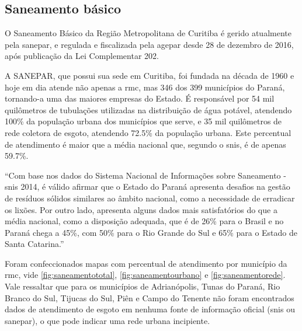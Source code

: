 	\subsection{Saneamento básico}
	
	O Saneamento Básico da Região Metropolitana de Curitiba é gerido atualmente pela \gls{sanepar}, e regulada e fiscalizada pela \gls{agepar} desde 28 de dezembro de 2016, após publicação da Lei Complementar 202.
	
	A SANEPAR, que possui sua sede em Curitiba, foi fundada na década de 1960 e hoje em dia atende não apenas a \gls{rmc}, mas 346 dos 399 municípios do Paraná, tornando-a uma das maiores empresas do Estado. É responsável por 54 mil quilômetros de tubulações utilizadas na distribuição de água potável, atendendo 100\% da população urbana dos municípios que serve, e 35 mil quilômetros de rede coletora de esgoto, atendendo 72.5\% da população urbana. Este percentual de atendimento é maior que a média nacional que, segundo o \gls{snis}, é de apenas 59.7\%. 
	
	\begin{citacao}
		``Com base nos dados do Sistema Nacional de Informações sobre Saneamento - \gls{snis} 2014, é válido afirmar que o Estado do Paraná apresenta desafios na gestão de resíduos sólidos similares ao âmbito nacional, como a necessidade de erradicar os lixões. Por outro lado, apresenta alguns dados mais satisfatórios do que a média nacional, como a disposição adequada, que é de 26\% para o Brasil e no Paraná chega a 45\%, com 50\% para o Rio Grande do Sul e 65\% para o Estado de Santa Catarina.'' \cite{anjos2016a}
	\end{citacao}

	Foram confeccionados mapas com percentual de atendimento por município da \gls{rmc}, vide \autoref{fig:saneamentototal}, \autoref{fig:saneamentourbano} e \autoref{fig:saneamentorede}. Vale ressaltar que para os municípios de Adrianópolis, Tunas do Paraná, Rio Branco do Sul, Tijucas do Sul, Piên e Campo do Tenente não foram encontrados dados de atendimento de esgoto em nenhuma fonte de informação oficial (\gls{snis} ou \gls{sanepar}), o que pode indicar uma rede urbana incipiente.
	
